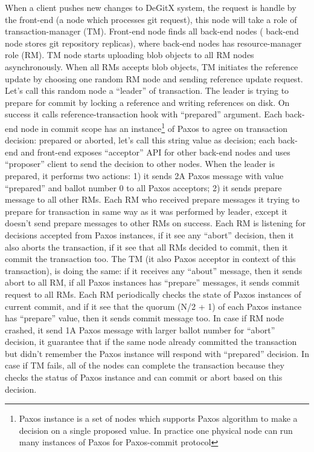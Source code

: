 \documentclass[sigplan, screen, nonacm, 11pt]{acmart}
\begin{document}
When a client pushes new changes to DeGitX system, the request is handle by the front-end (a node which processes
git request), this node will take a role of transaction-manager (TM). Front-end node finds all back-end nodes (
back-end node stores git repository replicas), where back-end nodes has resource-manager role (RM).
TM node starts uploading blob objects to all RM nodes asynchronously. When all RMs accepts blob objects,
TM initiates the reference update by choosing one random RM node and sending reference update request.
Let's call this random node a ``leader'' of transaction. The leader is trying to prepare for commit by
locking a reference and writing references on disk. On success it calls reference-transaction hook with ``prepared''
argument. Each back-end node in commit scope has an instance\footnote{Paxos instance is a set of nodes
which supports Paxos algorithm to make a decision on a single proposed value. In practice one physical node
can run many instances of Paxos for Paxos-commit protocol} of Paxos to agree on transaction decision: prepared or aborted,
let's call this string value as decision;
each back-end and front-end exposes ``acceptor'' API for other back-end nodes and uses ``proposer'' client to send
the decision to other nodes. When the leader is prepared, it performs two actions: 1) it sends 2A Paxos message with value
``prepared'' and ballot number 0 to all Paxos acceptors; 2) it sends prepare message to all other RMs.
Each RM who received prepare messages it trying to prepare for transaction in same way as it was performed by leader,
except it doesn't send prepare messages to other RMs on success. Each RM is listening for decisions accepted from Paxos
instances, if it see any ``abort'' decision, then it also aborts the transaction, if it see that all RMs decided to commit,
then it commit the transaction too. The TM (it also Paxos acceptor in context of this transaction), is doing the same:
if it receives any ``about'' message, then it sends abort to all RM, if all Paxos instances has ``prepare'' messages,
it sends commit request to all RMs. Each RM periodically checks the state of Paxos instances of current commit, and if it see
that the quorum (N/2 + 1) of each Paxos instance has ``prepare'' value, then it sends commit message too.
In case if RM node crashed, it send 1A Paxos message with larger ballot number for ``abort'' decision, it guarantee
that if the same node already committed the transaction but didn't remember the Paxos instance will respond with
``prepared'' decision. In case if TM fails, all of the nodes can complete the transaction because they checks the status
of Paxos instance and can commit or abort based on this decision.
\end{document}
